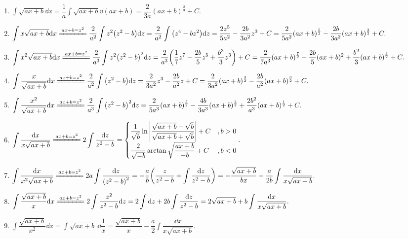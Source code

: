 \begin{enumerate}[label=\roman{*}.]
    \item $\displaystyle\int\sqrt{ax+b}\dd x=\dfrac{1}{a}\int\sqrt{ax+b}\dd (ax+b)=\dfrac{2}{3a}(ax+b)^{\frac{2}{3}}+C.$
    \item $\displaystyle \int x\sqrt{ax+b}\dd x \xlongequal{ax+b=z^2}\dfrac{2}{a^2}\int z^2\qty(z^2-b)\dd z=\dfrac{2}{a^2}\int\qty(z^4-bz^2)\dd z=\dfrac{2z^5}{5a^2}-\dfrac{2b}{3a^2}z^3+C=\dfrac{2}{5a^2}(ax+b)^{\frac{5}{2}}-\dfrac{2b}{3a^2}(ax+b)^{\frac{3}{2}}+C.$
    \item $\displaystyle \int x^2\sqrt{ax+b}\dd x \xlongequal{ax+b=z^2}\dfrac{2}{a^3}\int z^2\qty(z^2-b)^2\dd z=\dfrac{2}{a^3}\qty(\dfrac{1}{7}z^7-\dfrac{2b}{5}z^5+\dfrac{b^3}{3}z^3)+C=\dfrac{2}{7a^3}(ax+b)^{\frac{7}{2}}-\dfrac{2b}{5}(ax+b)^2+\dfrac{b^2}{3}(ax+b)^{\frac{3}{2}}+C.$
    \item $\displaystyle \int\dfrac{x}{\sqrt{ax+b}}\dd x \xlongequal{ax+b=z^2}\dfrac{2}{a^2}\int\qty(z^2-b)\dd z=\dfrac{2}{3a^2}z^3-\dfrac{2b}{a^2}z+C=\dfrac{2}{3a^2}(ax+b)^{\frac{3}{2}}-\dfrac{2b}{a^2}(ax+b)^{\frac{3}{2}}+C.$
    \item $\displaystyle \int\dfrac{x^2}{\sqrt{ax+b}}\dd x \xlongequal{ax+b=z^2}\dfrac{2}{a^3}\int\qty(z^2-b)^2\dd z=\dfrac{2}{5a^3}(ax+b)^{\frac{5}{2}}-\dfrac{4b}{3a^3}(ax+b)^{\frac{3}{2}}+\dfrac{2b^2}{a^3}(ax+b)^{\frac{1}{2}}+C.$
    \item $\displaystyle \int\dfrac{\dd x}{x\sqrt{ax+b}} \xlongequal{ax+b=z^2}2\int\dfrac{\dd z}{z^2-b}=\begin{cases}
                  \dfrac{1}{\sqrt{b}}\ln\qty|\dfrac{\sqrt{ax+b}-\sqrt{b}}{\sqrt{ax+b}+\sqrt{b}}|+C & ,b>0 \\[6pt]
                  \dfrac{2}{\sqrt{-b}}\arctan\sqrt{\dfrac{ax+b}{-b}}+C                             & ,b<0
              \end{cases}.$
    \item $\displaystyle \int\dfrac{\dd x}{x^2\sqrt{ax+b}} \xlongequal{ax+b=z^2}2a\int\dfrac{\dd z}{\qty(z^2-b)^2}=-\dfrac{a}{b}\qty(\dfrac{z}{z^2-b}+\int\dfrac{\dd z}{z^2-b})=-\dfrac{\sqrt{ax+b}}{bx}-\dfrac{a}{2b}\int\dfrac{\dd x}{x\sqrt{ax+b}}.$
    \item $\displaystyle \int\dfrac{\sqrt{ax+b}}{x}\dd x \xlongequal{ax+b=z^2}2\int\dfrac{z^2}{z^2-b}\dd z=2\int\dd z+2b\int\dfrac{\dd z}{z^2-b}=2\sqrt{ax+b}+b\int\dfrac{\dd x}{x\sqrt{ax+b}}.$
    \item $\displaystyle \int\dfrac{\sqrt{ax+b}}{x^2}\dd x =\int\sqrt{ax+b}~\dd \dfrac{1}{x}=\dfrac{\sqrt{ax+b}}{x}-\dfrac{a}{2}\int\dfrac{\dd x}{x\sqrt{ax+b}}.$
\end{enumerate}

